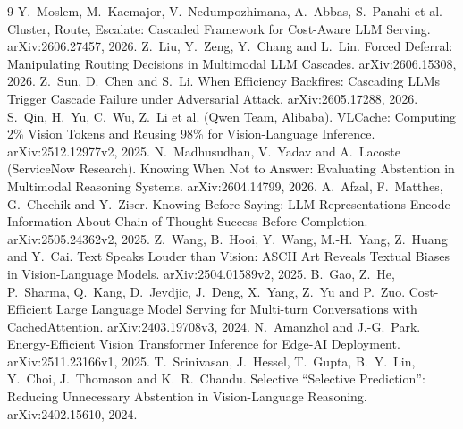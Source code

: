 \documentclass[10pt,twocolumn]{article}
\theoremstyle{plain}
\begin{document}
\begin{thebibliography}{9}
 Y.~Moslem, M.~Kacmajor, V.~Nedumpozhimana, A.~Abbas, S.~Panahi et al. Cluster, Route, Escalate: Cascaded Framework for Cost-Aware LLM Serving. arXiv:2606.27457, 2026.
 Z.~Liu, Y.~Zeng, Y.~Chang and L.~Lin. Forced Deferral: Manipulating Routing Decisions in Multimodal LLM Cascades. arXiv:2606.15308, 2026.
 Z.~Sun, D.~Chen and S.~Li. When Efficiency Backfires: Cascading LLMs Trigger Cascade Failure under Adversarial Attack. arXiv:2605.17288, 2026.
 S.~Qin, H.~Yu, C.~Wu, Z.~Li et al. (Qwen Team, Alibaba). VLCache: Computing 2\% Vision Tokens and Reusing 98\% for Vision-Language Inference. arXiv:2512.12977v2, 2025.
 N.~Madhusudhan, V.~Yadav and A.~Lacoste (ServiceNow Research). Knowing When Not to Answer: Evaluating Abstention in Multimodal Reasoning Systems. arXiv:2604.14799, 2026.
 A.~Afzal, F.~Matthes, G.~Chechik and Y.~Ziser. Knowing Before Saying: LLM Representations Encode Information About Chain-of-Thought Success Before Completion. arXiv:2505.24362v2, 2025.
 Z.~Wang, B.~Hooi, Y.~Wang, M.-H.~Yang, Z.~Huang and Y.~Cai. Text Speaks Louder than Vision: ASCII Art Reveals Textual Biases in Vision-Language Models. arXiv:2504.01589v2, 2025.
 B.~Gao, Z.~He, P.~Sharma, Q.~Kang, D.~Jevdjic, J.~Deng, X.~Yang, Z.~Yu and P.~Zuo. Cost-Efficient Large Language Model Serving for Multi-turn Conversations with CachedAttention. arXiv:2403.19708v3, 2024.
 N.~Amanzhol and J.-G.~Park. Energy-Efficient Vision Transformer Inference for Edge-AI Deployment. arXiv:2511.23166v1, 2025.
 T.~Srinivasan, J.~Hessel, T.~Gupta, B.~Y.~Lin, Y.~Choi, J.~Thomason and K.~R.~Chandu. Selective ``Selective Prediction'': Reducing Unnecessary Abstention in Vision-Language Reasoning. arXiv:2402.15610, 2024.
\end{thebibliography}
\end{document}
